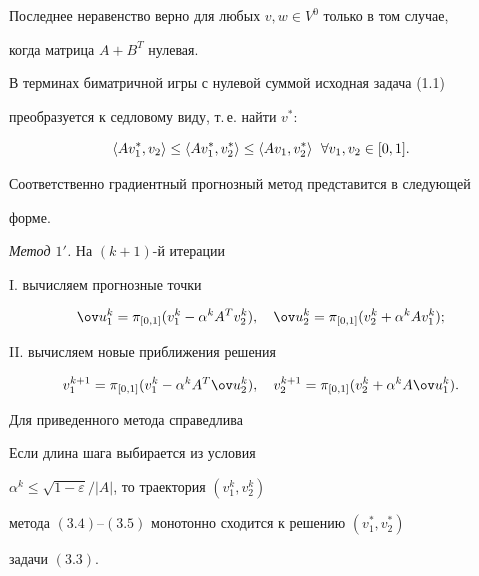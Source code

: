 Последнее неравенство верно для любых $v,w\in V^0$ только в том случае, 


когда матрица $A+B^T$ нулевая. 


 


В терминах биматричной игры с нулевой суммой исходная задача (1.1) 


преобразуется к седловому виду, т.\,е. найти $v^*$: 


\begin{equation} 


\la A v^*_1,v_2\ra\le\la A v^*_1,v^*_2\ra\le 


\la A v_1, v^*_2\ra\ \; \forall v_1,v_2\in[0,1]. 


\end{equation} 


Соответственно градиентный прогнозный метод представится в следующей 


форме.


 


{\it Метод $1'$.} На $(k+1)$-й итерации 


 


I. вычисляем прогнозные точки 


\begin{equation} 


\ov u{}^k_1=\pi_{[0,1]}(v^k_1-\alpha^k A^T v^k_2),\quad 


\ov u{}^k_2=\pi_{[0,1]}(v^k_2+\alpha^k A v^k_1);


\end{equation} 


 


II. вычисляем новые приближения решения


\begin{equation} 


v^{k+1}_1=\pi_{[0,1]}(v^k_1-\alpha^k A^T \ov u{}^k_2),\quad 


v^{k+1}_2=\pi_{[0,1]}(v^k_2+\alpha^k A\ov u{}^k_1). 


\end{equation} 


 


Для приведенного метода справедлива 


 


\begin{thm} 


Если длина шага выбирается из условия 


$\alpha^k\le\sqrt{1-\varepsilon}/|A|$, то траектория $(v^k_1,v^k_2)$ 


метода $(3.4)$--$(3.5)$ монотонно сходится к решению $(v^*_1,v^*_2)$ 


задачи $(3.3)$. 


\end{thm} 



